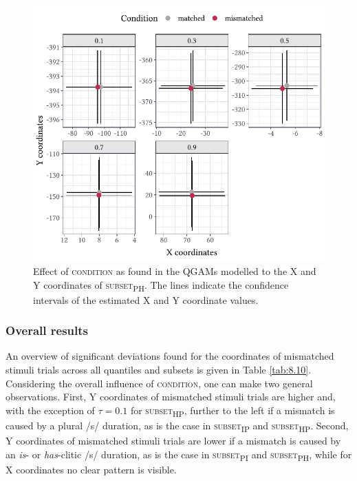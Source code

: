 \begin{figure}
    \centering
    \includegraphics[]{figures/fig8.6.pdf}
    \caption{Effect of \textsc{condition} as found in the QGAMs modelled to the X and Y coordinates of \textsc{subset\textsubscript{PH}}. The lines indicate the confidence intervals of the estimated X and Y coordinate values.}
    \label{fig:8_6}
\end{figure}

\subsubsection{Overall results}\label{section08_2_2_5}

An overview of significant deviations found for the coordinates of mismatched stimuli trials across all quantiles and subsets is given in Table \ref{tab:8.10}. Considering the overall influence of \textsc{condition}, one can make two general observations. First, Y coordinates of mismatched stimuli trials are higher and, with the exception of $\tau=0.1$ for \textsc{subset\textsubscript{HP}}, further to the left if a mismatch is caused by a plural /s/ duration, as is the case in \textsc{subset\textsubscript{IP}} and \textsc{subset\textsubscript{HP}}. Second, Y coordinates of mismatched stimuli trials are lower if a mismatch is caused by an \textit{is}- or \textit{has}-clitic /s/ duration, as is the case in \textsc{subset\textsubscript{PI}} and \textsc{subset\textsubscript{PH}}, while for X coordinates no clear pattern is visible.

